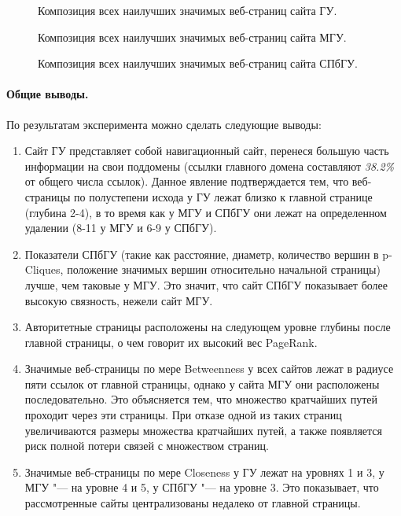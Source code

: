 \begin{figure}[ht]
	\caption{Композиция всех наилучших значимых веб-страниц сайта ГУ.}\label{fig:harvardUComposition}
\end{figure}

\begin{figure}[ht]
	\caption{Композиция всех наилучших значимых веб-страниц сайта МГУ.}\label{fig:moscowSUComposition}
\end{figure}

\begin{figure}[ht]
	\caption{Композиция всех наилучших значимых веб-страниц сайта СПбГУ.}\label{fig:spbUComposition}
\end{figure}

\paragraph{Общие выводы.} По результатам эксперимента можно сделать следующие выводы:
\begin{enumerate}
	\item Сайт ГУ представляет собой навигационный сайт, перенеся большую часть информации на свои поддомены (ссылки главного домена составляют \textit{38.2\%} от общего числа ссылок). Данное явление подтверждается тем, что веб-страницы по полустепени исхода у ГУ лежат близко к главной странице (глубина 2-4), в то время как у МГУ и СПбГУ они лежат на определенном удалении (8-11 у МГУ и 6-9 у СПбГУ).
	\item Показатели СПбГУ (такие как расстояние, диаметр, количество вершин в p-Cliques, положение значимых вершин относительно начальной страницы) лучше, чем таковые у МГУ. Это значит, что сайт СПбГУ показывает более высокую связность, нежели сайт МГУ.
	\item Авторитетные страницы расположены на следующем уровне глубины после главной страницы, о чем говорит их высокий вес PageRank.
	\item Значимые веб-страницы по мере Betweenness у всех сайтов лежат в радиусе пяти ссылок от главной страницы, однако у сайта МГУ они расположены последовательно. Это объясняется тем, что множество кратчайших путей проходит через эти страницы. При отказе одной из таких страниц увеличиваются размеры множества кратчайших путей, а также появляется риск полной потери связей с множеством страниц.
	\item Значимые веб-страницы по мере Closeness у ГУ лежат на уровнях 1 и 3, у МГУ "--- на уровне 4 и 5, у СПбГУ "--- на уровне 3. Это показывает, что рассмотренные сайты централизованы недалеко от главной страницы.
\end{enumerate}

